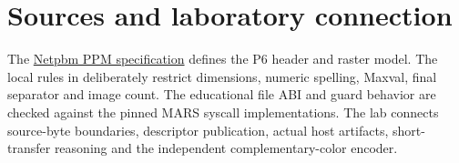 \section*{Sources and laboratory connection}
The \href{https://netpbm.sourceforge.net/doc/ppm.html}{Netpbm PPM specification}
defines the P6 header and raster model. The local rules in
 deliberately restrict dimensions, numeric spelling,
Maxval, final separator and image count. The educational file ABI and guard
behavior are checked against the pinned MARS syscall implementations. The lab
connects source-byte boundaries, descriptor publication, actual host artifacts,
short-transfer reasoning and the independent complementary-color encoder.
